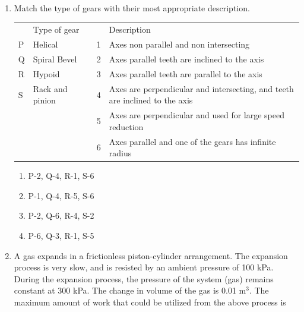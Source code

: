 \documentclass[journal,12pt,onecolumn]{IEEEtran}
\begin{document}
\begin{enumerate}
    \item Match the type of gears with their most appropriate description.
          \begin{table}[H]
              \centering\large
              \begin{tabular}{|p{0.2in}|p{1in}|p{0.2in}|p{0.2in}|p{3in}|}
                  \hline
                    & Type of gear    &  &   & Description                                                                 \\
                  \cline{1-2}\cline{4-5}
                  P & Helical         &  & 1 & Axes non parallel and non intersecting                                      \\
                  \cline{1-2}\cline{4-5}
                  Q & Spiral Bevel    &  & 2 & Axes parallel teeth are inclined to the axis                                \\
                  \cline{1-2}\cline{4-5}
                  R & Hypoid          &  & 3 & Axes parallel teeth are parallel to the axis                                \\
                  \cline{1-2}\cline{4-5}
                  S & Rack and pinion &  & 4 & Axes are perpendicular and intersecting, and teeth are inclined to the axis \\
                  \cline{1-2}\cline{4-5}
                    &                 &  & 5 & Axes are perpendicular and used for large speed reduction                   \\
                  \cline{1-2}\cline{4-5}
                    &                 &  & 6 & Axes parallel and one of the gears has infinite radius                      \\
                  \cline{1-2}\cline{4-5}
              \end{tabular}
              \label{q43}
          \end{table}

          \begin{enumerate}
              \item P-2, Q-4, R-1, S-6
              \item P-1, Q-4, R-5, S-6
              \item P-2, Q-6, R-4, S-2
              \item P-6, Q-3, R-1, S-5
          \end{enumerate}

    \item A gas expands in a frictionless piston-cylinder arrangement. The expansion process is very slow, and is resisted by an ambient pressure of 100 kPa. During the expansion process, the pressure of the system (gas) remains constant at 300 kPa. The change in volume of the gas is 0.01 m$^3$. The maximum amount of work that could be utilized from the above process is\\


\end{enumerate}
\end{document}
